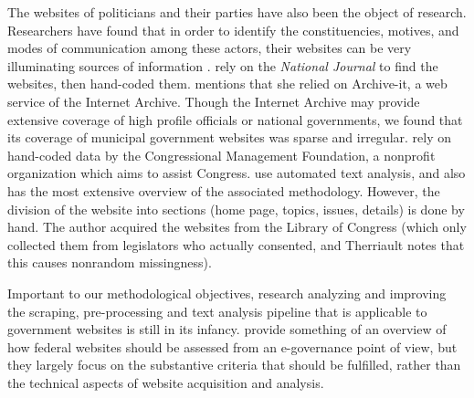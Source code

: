 \documentclass[11pt]{article}
\begin{document}
The websites of politicians and their parties have also been the object of research. Researchers have found that in order to identify the constituencies, motives, and modes of communication among these actors, their websites can be very illuminating sources of information \citep{Druckman2009,Druckman2010,Cryer2017,Esterling2011,Esterling2011a,Norris2003,Therriault2010}. \cite{Druckman2009,Druckman2010} rely on the \textit{National Journal} to find the websites, then hand-coded them. \cite{Cryer2017} mentions that she relied on Archive-it, a web service of the Internet Archive. Though the Internet Archive may provide extensive coverage of high profile officials or national governments, we found that its coverage of municipal government websites was sparse and irregular.
\cite{Esterling2011,Esterling2011a} rely on hand-coded data by the Congressional Management Foundation, a nonprofit organization which aims to assist Congress. \cite{Therriault2010} use automated text analysis, and also has the most extensive overview of the associated methodology. However, the division of the website into sections (home page, topics, issues, details) is done by hand. The author acquired the websites from the Library of Congress (which only collected them from legislators who actually consented, and Therriault notes that this causes nonrandom missingness).

Important to our methodological objectives, research analyzing and improving the scraping, pre-processing and text analysis pipeline that is applicable to government websites is still in its infancy. \cite{Eschenfelder2002} provide something of an overview of how federal websites should be assessed from an e-governance point of view, but they largely focus on the substantive criteria that should be fulfilled, rather than the technical aspects of website acquisition and analysis. %
\end{document}

